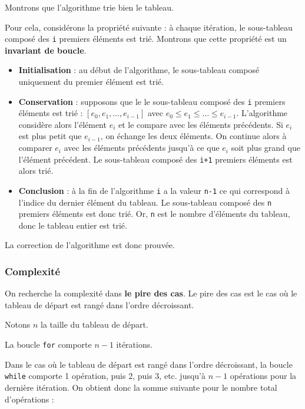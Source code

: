 \documentclass[
  a4paper,
  DIV=11,
  numbers=noendperiod]{scrartcl}
\providecommand{\tightlist}{%
  \setlength{\itemsep}{0pt}\setlength{\parskip}{0pt}}\usepackage{longtable,booktabs,array}
\begin{document}
Montrons que l'algorithme trie bien le tableau.

Pour cela, considérons la propriété suivante : à chaque itération, le
sous-tableau composé des \texttt{i} premiers éléments est trié. Montrons
que cette propriété est un \textbf{invariant de boucle}.

\begin{itemize}
\tightlist
\item
  \textbf{Initialisation} : au début de l'algorithme, le sous-tableau
  composé uniquement du premier élément est trié.
\item
  \textbf{Conservation} : supposons que le le sous-tableau composé des
  \texttt{i} premiers éléments est trié :
  \([e_0, e_1, \ldots, e_{i-1}]\) avec
  \(e_0\leqslant e_1\leqslant \ldots \leqslant e_{i-1}\). L'algorithme
  considère alors l'élément \(e_i\) et le compare avec les éléments
  précédents. Si \(e_i\) est plus petit que \(e_{i-1}\), on échange les
  deux éléments. On continue alors à comparer \(e_i\) avec les éléments
  précédents jusqu'à ce que \(e_i\) soit plus grand que l'élément
  précédent. Le sous-tableau composé des \texttt{i+1} premiers éléments
  est alors trié.
\item
  \textbf{Conclusion} : à la fin de l'algorithme \texttt{i} a la valeur
  \texttt{n-1} ce qui correspond à l'indice du dernier élément du
  tableau. Le sous-tableau composé des \texttt{n} premiers éléments est
  donc trié. Or, \texttt{n} est le nombre d'éléments du tableau, donc le
  tableau entier est trié.
\end{itemize}

La correction de l'algorithme est donc prouvée.

\hypertarget{complexituxe9}{%
\subsubsection{Complexité}\label{complexituxe9}}

On recherche la complexité dans \textbf{le pire des cas}. Le pire des
cas est le cas où le tableau de départ est rangé dans l'ordre
décroissant.

Notons \(n\) la taille du tableau de départ.

La boucle \texttt{for} comporte \(n-1\) itérations.

Dans le cas où le tableau de départ est rangé dans l'ordre décroissant,
la boucle \texttt{while} comporte 1 opération, puis 2, puis 3, etc.
jusqu'à \(n-1\) opérations pour la dernière itération. On obtient donc
la somme suivante pour le nombre total d'opérations :
\end{document}
